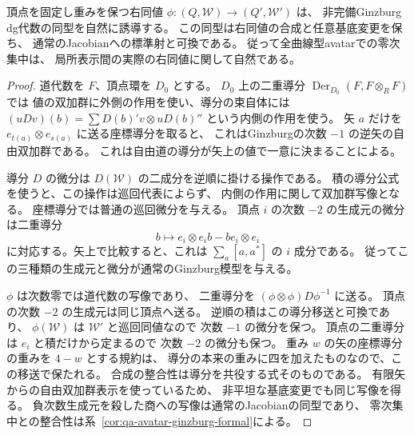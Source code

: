 \begin{proposition}
\label{prop:qa-ginzburg-right-equivalence-double-derivations}
頂点を固定し重みを保つ右同値
$\phi:(Q,\mathcal W)\to(Q',\mathcal W')$ は、
非完備Ginzburg dg代数の同型を自然に誘導する。
この同型は右同値の合成と任意基底変更を保ち、
通常のJacobianへの標準射と可換である。
従って全曲線型avatarでの零次集中は、
局所表示間の実際の右同値に関して自然である。
\end{proposition}
\begin{proof}
道代数を $F$、頂点環を $D_0$ とする。
$D_0$ 上の二重導分
$\operatorname{Der}_{D_0}(F,F\otimes_R F)$ では
値の双加群に外側の作用を使い、導分の束自体には
$ (uDv)(b)=\sum D(b)'v\otimes uD(b)''$ という内側の作用を使う。
矢 $a$ だけを $e_{t(a)}\otimes e_{s(a)}$ に送る座標導分を取ると、
これはGinzburgの次数 $-1$ の逆矢の自由双加群である。
これは自由道の導分が矢上の値で一意に決まることによる。

導分 $D$ の微分は
$D(\mathcal W)$ の二成分を逆順に掛ける操作である。
積の導分公式を使うと、この操作は巡回代表によらず、
内側の作用に関して双加群写像となる。
座標導分では普通の巡回微分を与える。
頂点 $i$ の次数 $-2$ の生成元の微分は二重導分
\[
 b\longmapsto e_i\otimes e_i b-b e_i\otimes e_i
\]
に対応する。矢上で比較すると、これは
$\sum_a[a,a^*]$ の $i$ 成分である。
従ってこの三種類の生成元と微分が通常のGinzburg模型を与える。

$\phi$ は次数零では道代数の写像であり、
二重導分を $(\phi\otimes\phi)D\phi^{-1}$ に送る。
頂点の次数 $-2$ の生成元は同じ頂点へ送る。
逆順の積はこの導分移送と可換であり、
$\phi(\mathcal W)$ は $\mathcal W'$ と巡回同値なので
次数 $-1$ の微分を保つ。
頂点の二重導分は $e_i$ と積だけから定まるので
次数 $-2$ の微分も保つ。
重み $w$ の矢の座標導分の重みを $4-w$ とする規約は、
導分の本来の重みに四を加えたものなので、この移送で保たれる。
合成の整合性は導分を共役する式そのものである。
有限矢からの自由双加群表示を使っているため、
非平坦な基底変更でも同じ写像を得る。
負次数生成元を殺した商への写像は通常のJacobianの同型であり、
零次集中との整合性は系~\ref{cor:qa-avatar-ginzburg-formal}による。
\end{proof}


